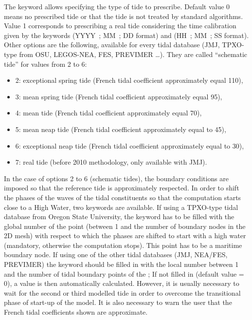  The keyword allows specifying the type of tide to prescribe. Default value 0 means no prescribed tide or that the tide is not treated by standard algorithms. Value 1 corresponds to prescribing a real tide considering the time calibration given by the keywords  (YYYY~; MM~; DD format) and  (HH~; MM~; SS format). Other
options are the following, available for every tidal database (JMJ,
TPXO-type from OSU, LEGOS-NEA, FES, PREVIMER \ldots).
They are called “schematic tide” for values from 2 to 6:

\begin{itemize}
\item [\nonumber] 2: exceptional spring tide (French tidal coefficient approximately equal 110),

\item [\nonumber] 3: mean spring tide (French tidal coefficient approximately equal 95),

\item [\nonumber] 4: mean tide (French tidal coefficient approximately equal 70),

\item [\nonumber] 5: mean neap tide (French tidal coefficient approximately equal to 45),

\item [\nonumber] 6: exceptional neap tide (French tidal coefficient approximately equal to 30),

\item [\nonumber] 7: real tide (before 2010 methodology, only available with JMJ).
\end{itemize}

In the case of options 2 to 6 (schematic tides), the boundary conditions are
imposed so that the reference tide is approximately respected.
In order to shift the phases of the waves of the tidal constituents so that
the computation starts close to a High Water, two keywords are available.
If using a TPXO-type tidal database from Oregon State University, the keyword
 has to be filled
with the global number of the point (between 1 and the number of boundary
nodes in the 2D mesh) with respect to which the phases are shifted
to start with a high water (mandatory, otherwise the computation stops).
This point has to be a maritime boundary node.
If using one of the other tidal databases (JMJ, NEA/FES, PREVIMER) the keyword
 should be filled in
with the local number between 1 and the number of tidal boundary points of the
; If not filled in (default value = 0), a value
is then automatically calculated.
However, it is usually necessary to wait for the second or third modelled tide in order to overcome the transitional phase of start-up of the model. It is also necessary to warn the user that the French tidal coefficients shown are approximate.


